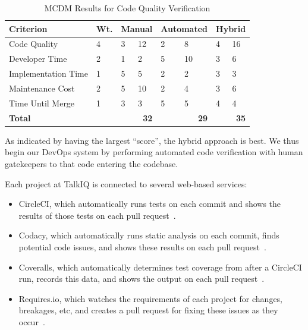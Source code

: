 \documentclass[12pt]{article}
\begin{document}
\begin{table}[ht]
\caption{MCDM Results for Code Quality Verification}
\label{tbl:mcdm-cqv}
\centering
\begin{tabular}{|p{4.0cm}|p{0.65cm}|p{0.5cm}|p{0.5cm}|p{0.8cm}|p{0.8cm}|p{0.45cm}|p{0.45cm}|}
    \hline
    {\bf Criterion} & {\bf Wt.} & \multicolumn{2}{|p{1cm}|}{{\bf Manual}} & \multicolumn{2}{|p{1.6cm}|}{{\bf \mbox{Automated}}} & \multicolumn{2}{|p{0.9cm}|}{{\bf Hybrid}} \\
    \hline
    \hline
    Code Quality        &  4 & 3 & 12 & 2 &  8 & 4 & 16 \\
    Developer Time      &  2 & 1 &  2 & 5 & 10 & 3 &  6 \\
    Implementation Time &  1 & 5 &  5 & 2 &  2 & 3 &  3 \\
    Maintenance Cost    &  2 & 5 & 10 & 2 &  4 & 3 &  6 \\
    Time Until Merge    &  1 & 3 &  3 & 5 &  5 & 4 &  4 \\
    \hline
    \hline
    {\bf Total}         &    & \multicolumn{2}{|r|}{{\bf 32}} & \multicolumn{2}{|r|}{{\bf 29}} & \multicolumn{2}{|r|}{{\bf 35}} \\
    \hline
\end{tabular}
\end{table}

As indicated by having the largest ``score'', the hybrid approach is best. We thus begin our DevOps system by performing automated code verification with human gatekeepers to that code entering the codebase.

Each project at TalkIQ is connected to several web-based services:
\begin{itemize}
\item CircleCI, which automatically runs tests on each commit and shows the results of those tests on each pull request~\cite{circleci}.
\item Codacy, which automatically runs static analysis on each commit, finds potential code issues, and shows these results on each pull request~\cite{codacy}.
\item Coveralls, which automatically determines test coverage from after a CircleCI run, records this data, and shows the output on each pull request~\cite{coveralls}.
\item Requires.io, which watches the requirements of each project for changes, breakages, etc, and creates a pull request for fixing these issues as they occur~\cite{requires}.
\end{itemize}
\end{document}
